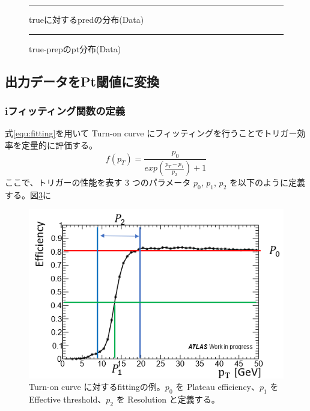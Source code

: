 \begin{figure}[tb]
  \centering
  \rule{8cm}{6cm}
  \caption{trueに対するpredの分布(Data)}
  \label{fig:fit_def}
\end{figure}

\begin{figure}[tb]
  \centering
  \rule{8cm}{6cm}
  \caption{true-prepのpt分布(Data)}
  \label{fig:fit_def}
\end{figure}




\subsection{出力データをPt閾値に変換}
\subsubsection{iフィッティング関数の定義}\label{section:fitting}
式\eqref{equ:fitting}を用いて Turn-on curve にフィッティングを行うことでトリガー効率を定量的に評価する。
\begin{equation}
    f(p_T) = \frac{p_0}{exp(\frac{p_T-p_1}{p_2})+1}
　\label{equ:fitting}
\end{equation}
ここで、トリガーの性能を表す 3 つのパラメータ $p_0$, $p_1$, $p_2$ を以下のように定義する。図\ref{fig:fiting}に
\begin{figure}[tb]
  \centering
  \includegraphics[clip, width=14cm]{fig/4/fitting_def.png}
  \caption{Turn-on curve に対するfittingの例。$p_0$ を Plateau efficiency、$p_1$ を Effective threshold、$p_2$ を Resolution と定義する。}
  \label{fig:fiting}
\end{figure}

